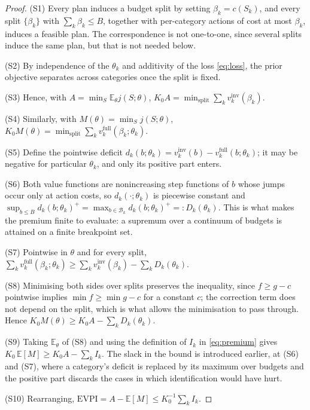 \documentclass[pdflatex,sn-mathphys-num]{sn-jnl}
\theoremstyle{thmstyleone}
\theoremstyle{thmstyletwo}
\theoremstyle{thmstylethree}
\newcommand{\evpi}{\mathrm{EVPI}}
\begin{document}
\begin{proof}
(S1) Every plan induces a budget split by setting $\beta_k=c(S_k)$, and every
split $\{\beta_k\}$ with $\sum_k\beta_k\le B$, together with per-category
actions of cost at most $\beta_k$, induces a feasible plan. The
correspondence is not one-to-one, since several splits induce the same plan,
but that is not needed below.

\noindent(S2) By independence of the $\theta_k$ and additivity of the loss
\eqref{eq:loss}, the prior objective separates across categories once the
split is fixed.

\noindent(S3) Hence, with $A=\min_S\mathbb{E}_\theta j(S;\theta)$,
$K_0A=\min_{\text{split}}\sum_k v_k^{\mathrm{inv}}(\beta_k)$.

\noindent(S4) Similarly, with $M(\theta)=\min_S j(S;\theta)$,
$K_0M(\theta)=\min_{\text{split}}\sum_k
v_k^{\mathrm{full}}(\beta_k;\theta_k)$.

\noindent(S5) Define the pointwise deficit
$d_k(b;\theta_k)=v_k^{\mathrm{inv}}(b)-v_k^{\mathrm{full}}(b;\theta_k)$; it
may be negative for particular $\theta_k$, and only its positive part enters.

\noindent(S6) Both value functions are nonincreasing step functions of $b$
whose jumps occur only at action costs, so $d_k(\cdot;\theta_k)$ is
piecewise constant and $\sup_{b\le B}d_k(b;\theta_k)^+
=\max_{b\in\mathcal{B}_k}d_k(b;\theta_k)^+=:D_k(\theta_k)$. This is what
makes the premium finite to evaluate: a supremum over a continuum of budgets
is attained on a finite breakpoint set.

\noindent(S7) Pointwise in $\theta$ and for every split,
$\sum_k v_k^{\mathrm{full}}(\beta_k;\theta_k)\ge
\sum_k v_k^{\mathrm{inv}}(\beta_k)-\sum_k D_k(\theta_k)$.

\noindent(S8) Minimising both sides over splits preserves the inequality,
since $f\ge g-c$ pointwise implies $\min f\ge\min g-c$ for a constant $c$;
the correction term does not depend on the split, which is what allows the
minimisation to pass through. Hence
$K_0M(\theta)\ge K_0A-\sum_k D_k(\theta_k)$.

\noindent(S9) Taking $\mathbb{E}_\theta$ of (S8) and using the definition of
$I_k$ in \eqref{eq:premium} gives $K_0\,\mathbb{E}[M]\ge K_0A-\sum_k I_k$.
The slack in the bound is introduced earlier, at (S6) and (S7), where a
category's deficit is replaced by its maximum over budgets and the positive
part discards the cases in which identification would have hurt.

\noindent(S10) Rearranging, $\evpi=A-\mathbb{E}[M]\le K_0^{-1}\sum_k I_k$.
\end{proof}
\end{document}
